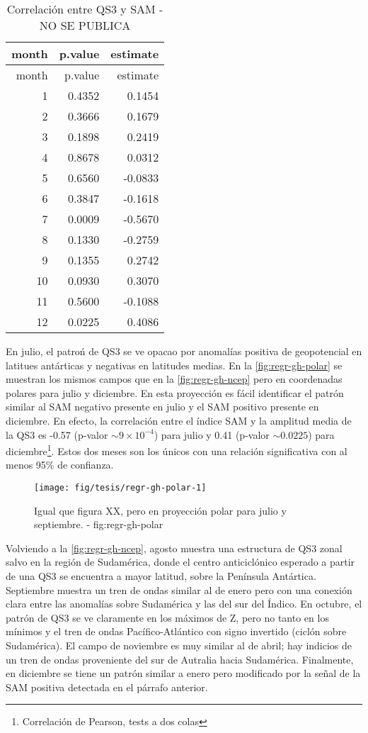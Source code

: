 \documentclass[spanish,a4paper]{book}
\let\rmarkdownfootnote\footnote%
\def\footnote{\protect\rmarkdownfootnote}
\begin{document}
\begin{longtable}[]{@{}rrr@{}}
\caption{Correlación entre QS3 y SAM - NO SE PUBLICA}\tabularnewline
\toprule
month & p.value & estimate\tabularnewline
\midrule
\endfirsthead
\toprule
month & p.value & estimate\tabularnewline
\midrule
\endhead
1 & 0.4352 & 0.1454\tabularnewline
2 & 0.3666 & 0.1679\tabularnewline
3 & 0.1898 & 0.2419\tabularnewline
4 & 0.8678 & 0.0312\tabularnewline
5 & 0.6560 & -0.0833\tabularnewline
6 & 0.3847 & -0.1618\tabularnewline
7 & 0.0009 & -0.5670\tabularnewline
8 & 0.1330 & -0.2759\tabularnewline
9 & 0.1355 & 0.2742\tabularnewline
10 & 0.0930 & 0.3070\tabularnewline
11 & 0.5600 & -0.1088\tabularnewline
12 & 0.0225 & 0.4086\tabularnewline
\bottomrule
\end{longtable}

En julio, el patroń de QS3 se ve opacao por anomalías positiva de
geopotencial en latitues antárticas y negativas en latitudes medias. En
la \autoref{fig:regr-gh-polar} se muestran los mismos campos que en la
\autoref{fig:regr-gh-ncep} pero en coordenadas polares para julio y
diciembre. En esta proyección es fácil identificar el patrón similar al
SAM negativo presente en julio y el SAM positivo
presente en diciembre. En efecto, la correlación entre el índice SAM y
la amplitud media de la QS3 es -0.57 (p-valor \(\sim 9\times 10^{-4}\))
para julio y 0.41 (p-valor \(\sim 0.0225\)) para
diciembre\footnote{Correlación de Pearson, tests a dos colas}. Estos dos
meses son los únicos con una relación significativa con al menos 95\% de
confianza.

\begin{figure*}
\texttt{[image: fig/tesis/regr-gh-polar-1]} \caption{Igual que figura  XX, pero en proyección polar para julio y septiembre. - fig:regr-gh-polar}\label{fig:regr-gh-polar}
\end{figure*}

Volviendo a la \autoref{fig:regr-gh-ncep}, agosto muestra una estructura
de QS3 zonal salvo en la región de Sudamérica, donde el centro
anticiclónico esperado a partir de una QS3 se encuentra a mayor latitud,
sobre la Península Antártica. Septiembre muestra un tren de ondas
similar al de enero pero con una conexión clara entre las anomalías
sobre Sudamérica y las del sur del Índico. En
octubre, el patrón de QS3 se ve claramente en los máximos de Z, pero no
tanto en los mínimos y el tren de ondas Pacífico-Atlántico con signo
invertido (ciclón sobre Sudamérica). El campo de noviembre es muy
similar al de abril; hay indicios de un tren de ondas proveniente del
sur de Autralia hacia Sudamérica. Finalmente, en diciembre se tiene un
patrón similar a enero pero modificado por la señal de la SAM positiva
detectada en el párrafo anterior.
\end{document}
